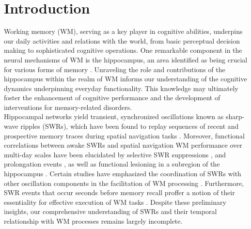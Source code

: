 \documentclass[preprint,review,12pt]{elsarticle}%
\newcommand\readwordcount[1]{%
  \openin\wordcount=#1
  \read\wordcount to \thewordcount
  \closein\wordcount
  \thewordcount
}
\begin{document}

\section{Introduction}
Working memory (WM), serving as a key player in cognitive abilities, underpins our daily activities and relations with the world, from basic perceptual decision making to sophisticated cognitive operations. One remarkable component in the neural mechanisms of WM is the hippocampus, an area identified as being crucial for various forms of memory \cite{scoville_loss_1957, squire_legacy_2009, boran_persistent_2019, kaminski_persistently_2017, kornblith_persistent_2017, faraut_dataset_2018, borders_hippocampus_2022, li_functional_2023, dimakopoulos_information_2022}. Unraveling the role and contributions of the hippocampus within the realm of WM informs our understanding of the cognitive dynamics underpinning everyday functionality. This knowledge may ultimately foster the enhancement of cognitive performance and the development of interventions for memory-related disorders.
\\
\indent
Hippocampal networks yield transient, synchronized oscillations known as sharp-wave ripples (SWRs), which have been found to replay sequences of recent and prospective memory traces during spatial navigation tasks \cite{foster_reverse_2006, karlsson_awake_2009, carr_hippocampal_2011, pfeiffer_hippocampal_2013}. Moreover, functional correlations between awake SWRs and spatial navigation WM performance over multi-day scales have been elucidated by selective SWR suppressions \cite{girardeau_selective_2009, jadhav_awake_2012, singer_hippocampal_2013}, and prolongation events \cite{fernandez-ruiz_long-duration_2019}, as well as functional lesioning in a subregion of the hippocampus \cite{sasaki_dentate_2018}. Certain studies have emphasized the coordination of SWRs with other oscillation components in the facilitation of WM processing \cite{tamura_hippocampal-prefrontal_2017, daume_control_2024}. Furthermore, SWR events that occur seconds before memory recall proffer a notion of their essentiality for effective execution of WM tasks \cite{wu_hippocampal_2017, norman_hippocampal_2019, norman_hippocampal_2021}. Despite these preliminary insights, our comprehensive understanding of SWRs and their temporal relationship with WM processes remains largely incomplete.
\end{document}
